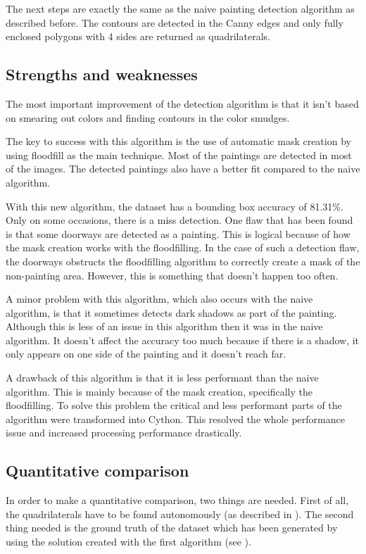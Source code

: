 The next steps are exactly the same as the naive painting detection algorithm as described before. The contours are detected in the Canny edges and only fully enclosed polygons with 4 sides are returned as quadrilaterals.

\subsection{Strengths and weaknesses}

The most important improvement of the detection algorithm is that it isn't based on smearing out colors and finding contours in the color smudges.

The key to success with this algorithm is the use of automatic mask creation by using floodfill as the main technique. Most of the paintings are detected in most of the images. The detected paintings also have a better fit compared to the naive algorithm.

With this new algorithm, the dataset has a bounding box accuracy of 81.31\%. Only on some occasions, there is a miss detection. One flaw that has been found is that some doorways are detected as a painting. This is logical because of how the mask creation works with the floodfilling. In the case of such a detection flaw, the doorways obstructs the floodfilling algorithm to correctly create a mask of the non-painting area. However, this is something that doesn't happen too often.

A minor problem with this algorithm, which also occurs with the naive algorithm, is that it sometimes detects dark shadows as part of the painting. Although this is less of an issue in this algorithm then it was in the naive algorithm. It doesn't affect the accuracy too much because if there is a shadow, it only appears on one side of the painting and it doesn't reach far.

A drawback of this algorithm is that it is less performant than the naive algorithm. This is mainly because of the mask creation, specifically the floodfilling. To solve this problem the critical and less performant parts of the algorithm were transformed into Cython. This resolved the whole performance issue and increased processing performance drastically. \cite{behnel2011cython}

\subsection{Quantitative comparison}
In order to make a quantitative comparison, two things are needed. First of all, the quadrilaterals have to be found autonomously (as described in ). The second thing needed is the ground truth of the dataset which has been generated by using the solution created with the first algorithm (see ).

